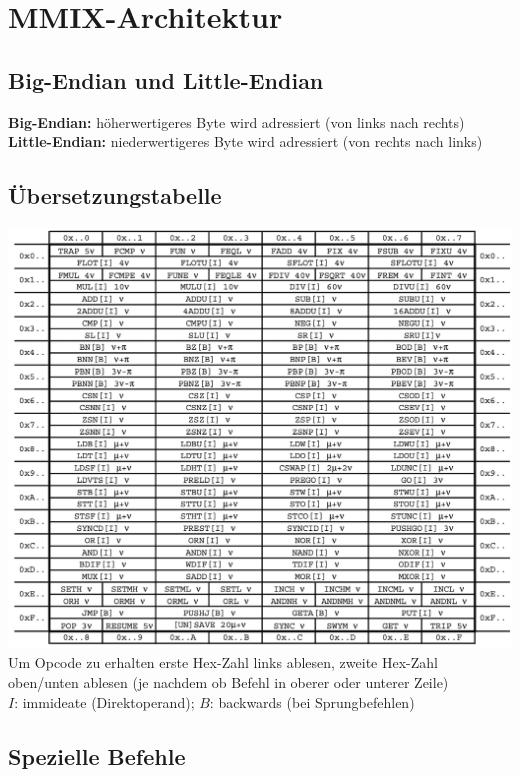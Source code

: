 \documentclass[ngerman, threecolumn, 8pt]{latex4ei/latex4ei_sheet}
\begin{document}
\begin{minipage}{\columnwidth}
\section{MMIX-Architektur}
\subsection{Big-Endian und Little-Endian}
\textbf{Big-Endian:} höherwertigeres Byte wird adressiert (von links nach rechts)\\
\textbf{Little-Endian:} niederwertigeres Byte wird adressiert (von rechts nach links)\\
\begin{sectionbox}
\subsection{Übersetzungstabelle}
\includegraphics[width=\linewidth]{img/Uebersetzungstabelle.png}
Um Opcode zu erhalten erste Hex-Zahl links ablesen, zweite Hex-Zahl oben/unten ablesen (je nachdem ob Befehl in oberer oder unterer Zeile)\\
$I$: immideate (Direktoperand); $B$: backwards (bei Sprungbefehlen)
\end{sectionbox}
\end{minipage}
\subsection{Spezielle Befehle}
\end{document}
